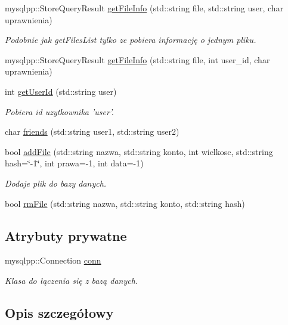 \begin{CompactItemize}
mysqlpp::StoreQueryResult \hyperlink{a00001_bc2479ccfcd28a0d2f7f303d202abfde}{getFileInfo} (std::string file, std::string user, char uprawnienia)
\begin{CompactList}\small\item\em Podobnie jak getFilesList tylko ze pobiera informację o jednym pliku. \item\end{CompactList}\item 
mysqlpp::StoreQueryResult \hyperlink{a00001_77b0a90456f585f9b21e7b42c9869047}{getFileInfo} (std::string file, int user\_\-id, char uprawnienia)
\item 
int \hyperlink{a00001_65054f08c8fd7c600f6c2fe2c7f61a43}{getUserId} (std::string user)
\begin{CompactList}\small\item\em Pobiera id uzytkownika 'user'. \item\end{CompactList}\item 
char \hyperlink{a00001_170c8dad434281805524834ace0a3109}{friends} (std::string user1, std::string user2)
\item 
bool \hyperlink{a00001_abbda65be49dfb28b1a578d0383599fa}{addFile} (std::string nazwa, std::string konto, int wielkosc, std::string hash=\char`\"{}-1\char`\"{}, int prawa=-1, int data=-1)
\begin{CompactList}\small\item\em Dodaje plik do bazy danych. \item\end{CompactList}\item 
bool \hyperlink{a00001_7161c573401166cc5f7d98ae6f335b44}{rmFile} (std::string nazwa, std::string konto, std::string hash)
\end{CompactItemize}
\subsection*{Atrybuty prywatne}
\begin{CompactItemize}
\item 
mysqlpp::Connection \hyperlink{a00001_f966364deec225fdf2d2d22550c71c88}{conn}
\begin{CompactList}\small\item\em Klasa do łączenia się z bazą danych. \item\end{CompactList}\end{CompactItemize}


\subsection{Opis szczegółowy}


